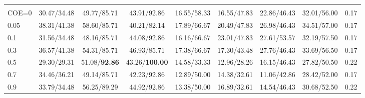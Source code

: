 \begin{table}[t]
{\begin{tabular}{@{}lcccccccc@{}}
\rowcolor{gray!15}
\multicolumn{9}{@{}l@{}}{\textbf{\textbf{BudgetMem-\textsc{Cap}} (COE)}} \\
COE=0   & 30.47/34.48 & 49.77/85.71 & 43.91/92.86 & 16.55/58.33 & 16.55/47.83 & 22.86/46.43 & 32.01/56.00 & 0.17 \\
0.05    & 38.31/41.38 & 58.60/85.71 & 40.21/82.14 & 17.89/66.67 & 20.49/47.83 & 26.98/46.43 & 34.51/57.00 & 0.17 \\
0.1     & 31.56/34.48 & 48.16/85.71 & 44.08/92.86 & 16.16/66.67 & 23.01/47.83 & 27.61/53.57 & 32.19/57.50 & 0.17 \\
0.3     & 36.57/41.38 & 54.31/85.71 & 46.93/85.71 & 17.38/66.67 & 17.30/43.48 & 27.76/46.43 & 33.69/56.50 & 0.17 \\
0.5     & 29.30/29.31 & 51.08/\textbf{92.86} & 43.26/\textbf{100.00} & 14.58/33.33 & 12.96/28.26 & 16.15/46.43 & 27.82/50.50 & 0.22 \\
0.7     & 34.46/36.21 & 49.14/85.71 & 42.23/92.86 & 12.89/50.00 & 14.38/32.61 & 11.06/42.86 & 28.42/52.00 & 0.17 \\
0.9     & 33.79/34.48 & 56.25/89.29 & 44.92/92.86 & 13.38/50.00 & 16.89/32.61 & 14.54/46.43 & 30.68/52.50 & 0.22 \\
\bottomrule
\end{tabular}
}
\end{table}

